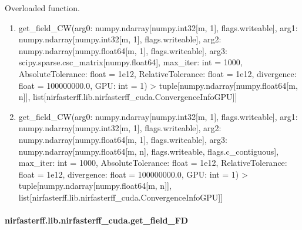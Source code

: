 \documentclass[letterpaper,10pt,english]{sphinxmanual}
\begin{document}
\begin{fulllineitems}
\label{\detokenize{_autosummary/nirfasterff.lib.nirfasterff_cuda.get_field_CW:nirfasterff.lib.nirfasterff_cuda.get_field_CW}}
\pysigstartsignatures
\pysiglinewithargsret
{}
{\sphinxparamcomma {}}
{}
\pysigstopsignatures
\sphinxAtStartPar
Overloaded function.
\begin{enumerate}
%
\item {} 
\sphinxAtStartPar
get\_field\_CW(arg0: numpy.ndarray{[}numpy.int32{[}m, 1{]}, flags.writeable{]}, arg1: numpy.ndarray{[}numpy.int32{[}m, 1{]}, flags.writeable{]}, arg2: numpy.ndarray{[}numpy.float64{[}m, 1{]}, flags.writeable{]}, arg3: scipy.sparse.csc\_matrix{[}numpy.float64{]}, max\_iter: int = 1000, AbsoluteTolerance: float = 1e\sphinxhyphen{}12, RelativeTolerance: float = 1e\sphinxhyphen{}12, divergence: float = 100000000.0, GPU: int = \sphinxhyphen{}1) \sphinxhyphen{}\textgreater{} tuple{[}numpy.ndarray{[}numpy.float64{[}m, n{]}{]}, list{[}nirfasterff.lib.nirfasterff\_cuda.ConvergenceInfoGPU{]}{]}

\item {} 
\sphinxAtStartPar
get\_field\_CW(arg0: numpy.ndarray{[}numpy.int32{[}m, 1{]}, flags.writeable{]}, arg1: numpy.ndarray{[}numpy.int32{[}m, 1{]}, flags.writeable{]}, arg2: numpy.ndarray{[}numpy.float64{[}m, 1{]}, flags.writeable{]}, arg3: numpy.ndarray{[}numpy.float64{[}m, n{]}, flags.writeable, flags.c\_contiguous{]}, max\_iter: int = 1000, AbsoluteTolerance: float = 1e\sphinxhyphen{}12, RelativeTolerance: float = 1e\sphinxhyphen{}12, divergence: float = 100000000.0, GPU: int = \sphinxhyphen{}1) \sphinxhyphen{}\textgreater{} tuple{[}numpy.ndarray{[}numpy.float64{[}m, n{]}{]}, list{[}nirfasterff.lib.nirfasterff\_cuda.ConvergenceInfoGPU{]}{]}

\end{enumerate}

\end{fulllineitems}


\sphinxstepscope


\paragraph{nirfasterff.lib.nirfasterff\_cuda.get\_field\_FD}
\label{\detokenize{_autosummary/nirfasterff.lib.nirfasterff_cuda.get_field_FD:nirfasterff-lib-nirfasterff-cuda-get-field-fd}}\label{\detokenize{_autosummary/nirfasterff.lib.nirfasterff_cuda.get_field_FD::doc}}
\end{document}
